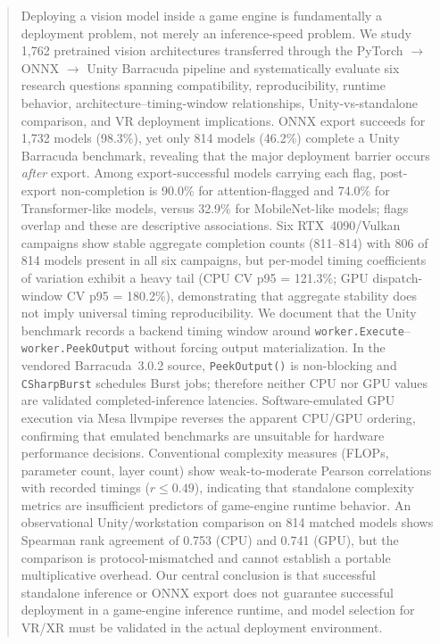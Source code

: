 \documentclass[10pt,twocolumn]{article}
\begin{document}
\begin{abstract}
Deploying a vision model inside a game engine is fundamentally a deployment problem, not merely an inference-speed problem.
We study 1,762 pretrained vision architectures transferred through the PyTorch $\rightarrow$ ONNX $\rightarrow$ Unity Barracuda pipeline and systematically evaluate six research questions spanning compatibility, reproducibility, runtime behavior, architecture--timing-window relationships, Unity-vs-standalone comparison, and VR deployment implications.
ONNX export succeeds for 1,732 models (98.3\%), yet only 814 models (46.2\%) complete a Unity Barracuda benchmark, revealing that the major deployment barrier occurs \emph{after} export.
Among export-successful models carrying each flag, post-export non-completion is 90.0\% for attention-flagged and 74.0\% for Transformer-like models, versus 32.9\% for MobileNet-like models; flags overlap and these are descriptive associations.
Six RTX~4090/Vulkan campaigns show stable aggregate completion counts (811--814) with 806 of 814 models present in all six campaigns, but per-model timing coefficients of variation exhibit a heavy tail (CPU CV p95 = 121.3\%; GPU dispatch-window CV p95 = 180.2\%), demonstrating that aggregate stability does not imply universal timing reproducibility.
We document that the Unity benchmark records a backend timing window around \texttt{worker.Execute}--\texttt{worker.PeekOutput} without forcing output materialization. In the vendored Barracuda~3.0.2 source, \texttt{PeekOutput()} is non-blocking and \texttt{CSharpBurst} schedules Burst jobs; therefore neither CPU nor GPU values are validated completed-inference latencies.
Software-emulated GPU execution via Mesa llvmpipe reverses the apparent CPU/GPU ordering, confirming that emulated benchmarks are unsuitable for hardware performance decisions.
Conventional complexity measures (FLOPs, parameter count, layer count) show weak-to-moderate Pearson correlations with recorded timings ($r \leq 0.49$), indicating that standalone complexity metrics are insufficient predictors of game-engine runtime behavior.
An observational Unity/workstation comparison on 814 matched models shows Spearman rank agreement of 0.753 (CPU) and 0.741 (GPU), but the comparison is protocol-mismatched and cannot establish a portable multiplicative overhead.
Our central conclusion is that successful standalone inference or ONNX export does not guarantee successful deployment in a game-engine inference runtime, and model selection for VR/XR must be validated in the actual deployment environment.
\end{abstract}
\end{document}
